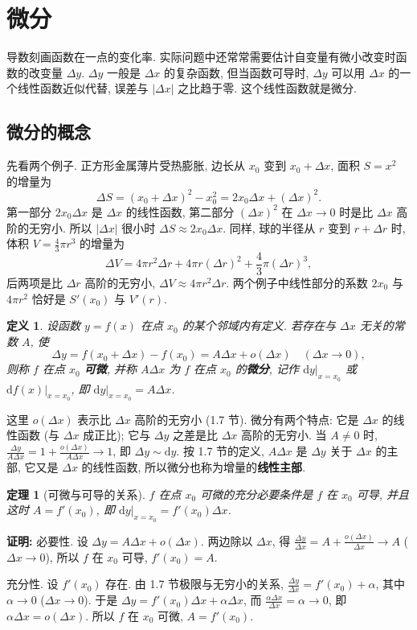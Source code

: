 \documentclass[UTF8,openany]{ctexbook}
\theoremstyle{chinesetextbook}
\newenvironment{cnproof}{\par\indent\textbf{证明:} \ignorespaces}{\par}
\newtheorem*{definitionsingle}{定义}
\newtheorem*{theoremsingle}{定理}
\newcommand{\dd}{\mathrm d}
\begin{document}
\section{微分}
导数刻画函数在一点的变化率. 实际问题中还常常需要估计自变量有微小改变时函数的改变量 $\Delta y$. $\Delta y$ 一般是 $\Delta x$ 的复杂函数, 但当函数可导时, $\Delta y$ 可以用 $\Delta x$ 的一个线性函数近似代替, 误差与 $|\Delta x|$ 之比趋于零. 这个线性函数就是微分.
\subsection{微分的概念}
先看两个例子. 正方形金属薄片受热膨胀, 边长从 $x_0$ 变到 $x_0+\Delta x$, 面积 $S=x^2$ 的增量为
\[
\Delta S=(x_0+\Delta x)^2-x_0^2=2x_0\Delta x+(\Delta x)^2.
\]
第一部分 $2x_0\Delta x$ 是 $\Delta x$ 的线性函数, 第二部分 $(\Delta x)^2$ 在 $\Delta x\to0$ 时是比 $\Delta x$ 高阶的无穷小. 所以 $|\Delta x|$ 很小时 $\Delta S\approx2x_0\Delta x$. 同样, 球的半径从 $r$ 变到 $r+\Delta r$ 时, 体积 $\displaystyle V=\frac43\pi r^3$ 的增量为
\[
\Delta V=4\pi r^2\Delta r+4\pi r(\Delta r)^2+\frac43\pi(\Delta r)^3,
\]
后两项是比 $\Delta r$ 高阶的无穷小, $\Delta V\approx4\pi r^2\Delta r$. 两个例子中线性部分的系数 $2x_0$ 与 $4\pi r^2$ 恰好是 $S'(x_0)$ 与 $V'(r)$.
\begin{definitionsingle}
设函数 $y=f(x)$ 在点 $x_0$ 的某个邻域内有定义. 若存在与 $\Delta x$ 无关的常数 $A$, 使
\[
\Delta y=f(x_0+\Delta x)-f(x_0)=A\Delta x+o(\Delta x)\quad(\Delta x\to0),
\]
则称 $f$ 在点 $x_0$ \textbf{可微}, 并称 $A\Delta x$ 为 $f$ 在点 $x_0$ 的\textbf{微分}, 记作 $\dd y\big|_{x=x_0}$ 或 $\dd f(x)\big|_{x=x_0}$, 即 $\dd y\big|_{x=x_0}=A\Delta x$.
\end{definitionsingle}
这里 $o(\Delta x)$ 表示比 $\Delta x$ 高阶的无穷小 (1.7 节). 微分有两个特点: 它是 $\Delta x$ 的线性函数 (与 $\Delta x$ 成正比); 它与 $\Delta y$ 之差是比 $\Delta x$ 高阶的无穷小. 当 $A\ne0$ 时, $\displaystyle\frac{\Delta y}{A\Delta x}=1+\frac{o(\Delta x)}{A\Delta x}\to1$, 即 $\Delta y\sim\dd y$. 按 1.7 节的定义, $A\Delta x$ 是 $\Delta y$ 关于 $\Delta x$ 的主部, 它又是 $\Delta x$ 的线性函数, 所以微分也称为增量的\textbf{线性主部}.
\begin{theoremsingle}[可微与可导的关系]
$f$ 在点 $x_0$ 可微的充分必要条件是 $f$ 在 $x_0$ 可导, 并且这时 $A=f'(x_0)$, 即 $\dd y\big|_{x=x_0}=f'(x_0)\Delta x$.
\end{theoremsingle}
\begin{cnproof}
必要性. 设 $\Delta y=A\Delta x+o(\Delta x)$. 两边除以 $\Delta x$, 得 $\displaystyle\frac{\Delta y}{\Delta x}=A+\frac{o(\Delta x)}{\Delta x}\to A$ ($\Delta x\to0$), 所以 $f$ 在 $x_0$ 可导, $f'(x_0)=A$.

充分性. 设 $f'(x_0)$ 存在. 由 1.7 节极限与无穷小的关系, $\displaystyle\frac{\Delta y}{\Delta x}=f'(x_0)+\alpha$, 其中 $\alpha\to0$ ($\Delta x\to0$). 于是 $\Delta y=f'(x_0)\Delta x+\alpha\Delta x$, 而 $\displaystyle\frac{\alpha\Delta x}{\Delta x}=\alpha\to0$, 即 $\alpha\Delta x=o(\Delta x)$. 所以 $f$ 在 $x_0$ 可微, $A=f'(x_0)$.
\end{cnproof}
\end{document}
